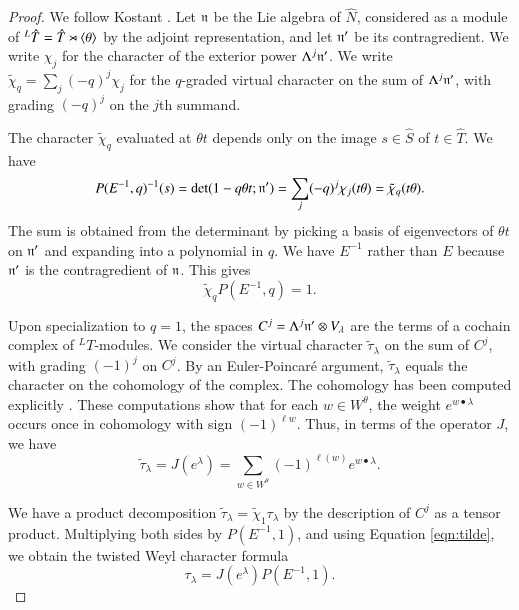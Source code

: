 \begin{proof} We follow Kostant \cite{kostant1961lie}.
Let ${\mathfrak n}$ be the Lie algebra of $\hat N$, considered as a module of ${}^L\hat T=\hat T\rtimes\langle{\theta}\rangle$ by the adjoint representation,
and let ${\mathfrak n}'$ be its contragredient.  We write $\chi_j$ for the character of the exterior power $\Lambda^j {\mathfrak n}'$.
  We write $\tilde\chi_q = \sum_j (-q)^j\chi_j$
for the $q$-graded virtual character on the sum of $\Lambda^j {\mathfrak n}'$, with grading $(-q)^j$ on the $j$th summand.  

The character $\tilde\chi_q$ evaluated at $\theta t$ depends only on the image $s\in\hat S$ of $t\in \hat T$.
We have 
\[
P(E^{-1},q)^{-1}(s) = \det(1- q\theta t;{\mathfrak n}') = \sum_j (-q)^j \chi_j(t\theta) = \tilde\chi_q(t\theta).
\]
The sum is obtained from
 the determinant  by picking a basis of eigenvectors of $\theta t$ on ${\mathfrak n}'$ and expanding into a polynomial
in $q$.
We have $E^{-1}$ rather than $E$ because ${\mathfrak n}'$ is the contragredient of ${\mathfrak n}$.
This gives
\begin{equation}\label{eqn:tilde}
\tilde\chi_q P(E^{-1},q) = 1.
\end{equation}

Upon specialization to $q=1$, 
the spaces $C^j=\Lambda^j {\mathfrak n}'\otimes V_\lambda$ are the terms of a cochain complex of ${}^LT$-modules.
We consider the virtual character $\tilde \tau_\lambda$ on  
the sum of $C^j$, with grading $(-1)^j$ on $C^j$.  
By an Euler-Poincar\'e argument, 
$\tilde\tau_\lambda$ equals the character on the cohomology of the complex.  The cohomology has 
been computed explicitly \cite{kostant1961lie}.
These computations show that for each $w\in W^\theta$, the weight $e^{w\bullet \lambda}$ 
occurs once in cohomology with sign $(-1)^{\ell w}$.
Thus, in terms of the operator $J$, we have
\[
\tilde \tau_\lambda = J(e^\lambda) = \sum_{w\in W^\theta} (-1)^{\ell(w)} e^{w\bullet\lambda}.
\]

We have  a product decomposition $\tilde \tau_\lambda = \tilde \chi_{1}\tau_\lambda $ by the description of $C^j$ as
a tensor product.
Multiplying both sides by $P(E^{-1},1)$, and using
Equation \ref{eqn:tilde}, we obtain the twisted Weyl character formula
\begin{equation}
\tau_\lambda = J(e^\lambda) P(E^{-1},1).
\end{equation}
\end{proof}


